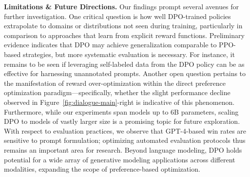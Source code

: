 \textbf{Limitations \& Future Directions.} Our findings prompt several avenues for further investigation. One critical question is how well DPO-trained policies extrapolate to domains or distributions not seen during training, particularly in comparison to approaches that learn from explicit reward functions. Preliminary evidence indicates that DPO may achieve generalization comparable to PPO-based strategies, but more systematic evaluation is necessary. For instance, it remains to be seen if leveraging self-labeled data from the DPO policy can be as effective for harnessing unannotated prompts. Another open question pertains to the manifestation of reward over-optimization within the direct preference optimization paradigm—specifically, whether the slight performance decline observed in Figure~\ref{fig:dialogue-main}-right is indicative of this phenomenon. Furthermore, while our experiments span models up to 6B parameters, scaling DPO to models of vastly larger size is a promising topic for future exploration. With respect to evaluation practices, we observe that GPT-4-based win rates are sensitive to prompt formulation; optimizing automated evaluation protocols thus remains an important area for research. Beyond language modeling, DPO holds potential for a wide array of generative modeling applications across different modalities, expanding the scope of preference-based optimization.